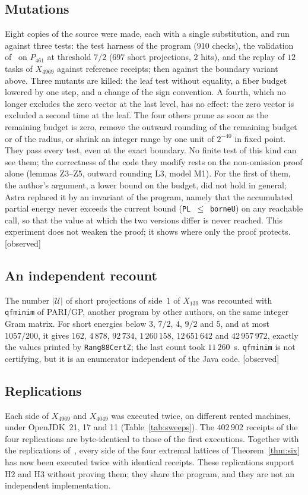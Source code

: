 \documentclass[11pt,a4paper]{amsart}
\theoremstyle{plain}
\theoremstyle{definition}
\newcommand{\Uc}{\mathcal{U}}
\newcommand{\st}[1]{\textup{\textsf{\small[#1]}}}
\newcommand{\CONS}{\st{observed}}
\begin{document}
\subsection{Mutations}
Eight copies of the source were made, each with a single substitution, and run against three tests: the test harness of the program ($910$ checks), the validation of~\cite[\S5.2]{Gau26} on $P_{461}$ at threshold $7/2$ ($697$ short projections, $2$ hits), and the replay of $12$ tasks of $X_{4969}$ against reference receipts; then against the boundary variant above. Three mutants are killed: the leaf test without equality, a fiber budget lowered by one step, and a change of the sign convention. A fourth, which no longer excludes the zero vector at the last level, has no effect: the zero vector is excluded a second time at the leaf. The four others prune as soon as the remaining budget is zero, remove the outward rounding of the remaining budget or of the radius, or shrink an integer range by one unit of $2^{-40}$ in fixed point. They pass every test, even at the exact boundary. No finite test of this kind can see them; the correctness of the code they modify rests on the non-omission proof alone (lemmas Z3--Z5, outward rounding L3, model M1). For the first of them, the author's argument, a lower bound on the budget, did not hold in general; Astra replaced it by an invariant of the program, namely that the accumulated partial energy never exceeds the current bound (\texttt{PL}~$\le$~\texttt{borneU}) on any reachable call, so that the value at which the two versions differ is never reached. This experiment does not weaken the proof; it shows where only the proof protects. \CONS

\subsection{An independent recount}
The number $|\Uc|$ of short projections of side~$1$ of $X_{139}$ was recounted with \texttt{qfminim} of PARI/GP, another program by other authors, on the same integer Gram matrix. For short energies below $3$, $7/2$, $4$, $9/2$ and $5$, and at most $1057/200$, it gives $162$, $4\,878$, $92\,734$, $1\,260\,158$, $12\,651\,642$ and $42\,957\,972$, exactly the values printed by \texttt{Rang88CertZ}; the last count took $11\,260$~s. \texttt{qfminim} is not certifying, but it is an enumerator independent of the Java code. \CONS

\subsection{Replications}
Each side of $X_{4969}$ and $X_{4049}$ was executed twice, on different rented machines, under OpenJDK~21, 17 and 11 (Table~\ref{tab:sweeps}). The $402\,902$ receipts of the four replications are byte-identical to those of the first executions. Together with the replications of~\cite{Gau26}, every side of the four extremal lattices of Theorem~\ref{thm:six} has now been executed twice with identical receipts. These replications support H2 and H3 without proving them; they share the program, and they are not an independent implementation.
\end{document}

